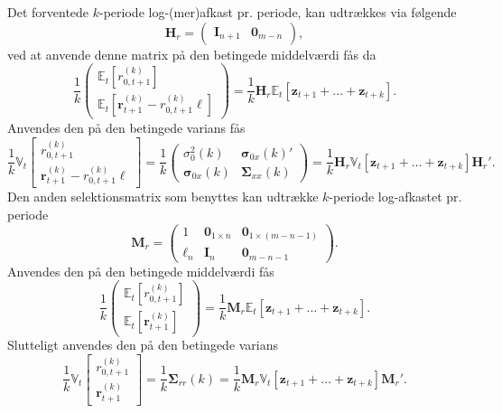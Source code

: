 \documentclass[
  a4paper,
  oneside]{memoir}
\begin{document}
Det forventede \(k\)-periode log-(mer)afkast pr. periode, kan udtrækkes via følgende
\begin{equation*}
        \bm{H}_r=\begin{pmatrix}\bm{I}_{n+1} & \bm{0}_{m-n}\end{pmatrix},
    \end{equation*}
ved at anvende denne matrix på den betingede middelværdi fås da
\begin{equation}
        \frac{1}{k}\begin{pmatrix}
        \mathbb{E}_t\left[ r_{0,t+1}^{(k)} \right]\\
        \mathbb{E}_t\left[ \bm{r}_{t+1}^{(k)}-r_{0,t+1}^{(k)}\bm{\bm{\ell}} \right]
        \end{pmatrix}=\frac{1}{k}\bm{H}_r\mathbb{E}_t[\bm{z}_{t+1}+\dots+\bm{z}_{t+k}].
    \end{equation}
Anvendes den på den betingede varians fås
\begin{equation}
        \frac{1}{k}\mathbb{V}_t\begin{bmatrix}
        r_{0,t+1}^{(k)}\\
        \bm{r}_{t+1}^{(k)}-r_{0,t+1}^{(k)}\bm{\bm{\ell}}
        \end{bmatrix}=\frac{1}{k}\begin{pmatrix}
        \sigma_0^2(k) & \bm{\sigma}_{0x}(k)'\\
        \bm{\sigma}_{0x}(k) & \bm{\Sigma}_{xx}(k)
        \end{pmatrix}=\frac{1}{k}\bm{H}_r\mathbb{V}_t[\bm{z}_{t+1}+\dots+\bm{z}_{t+k}]\bm{H}_r'.
    \end{equation}
Den anden selektionsmatrix som benyttes kan udtrække \(k\)-periode log-afkastet pr. periode
\begin{equation}
        \bm{M}_r=\begin{pmatrix}
        1 & \bm{0}_{1\times n} & \bm{0}_{1\times (m-n-1)}\\
        \bm{\bm{\ell}}_n & \bm{I}_n & \bm{0}_{m-n-1}
        \end{pmatrix}.\label{eq:sel}
    \end{equation}
Anvendes den på den betingede middelværdi fås
\begin{equation}
        \frac{1}{k}\begin{pmatrix}
        \mathbb{E}_t\left[ r_{0,t+1}^{(k)} \right]\\
        \mathbb{E}_t\left[ \bm{r}_{t+1}^{(k)} \right]
        \end{pmatrix}=\frac{1}{k}\bm{M}_r\mathbb{E}_t[\bm{z}_{t+1}+\dots+\bm{z}_{t+k}].
    \end{equation}
Slutteligt anvendes den på den betingede varians
\begin{equation}
        \frac{1}{k}\mathbb{V}_t\begin{bmatrix}
        r_{0,t+1}^{(k)}\\
        \bm{r}_{t+1}^{(k)}
        \end{bmatrix}=\frac{1}{k}\bm{\Sigma}_{rr}(k)=\frac{1}{k}\bm{M}_r\mathbb{V}_t[\bm{z}_{t+1}+\dots+\bm{z}_{t+k}]\bm{M}_r'.\label{eq:bv}
    \end{equation}
\end{document}
